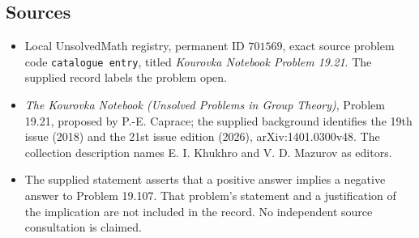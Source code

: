 \documentclass[11pt]{article}
\begin{document}
\subsection{Sources}
\begin{itemize}
\item Local UnsolvedMath registry, permanent ID \(701569\), exact source problem code \texttt{catalogue entry}, titled \emph{Kourovka Notebook Problem 19.21}. The supplied record labels the problem open.
\item \emph{The Kourovka Notebook (Unsolved Problems in Group Theory)}, Problem 19.21, proposed by P.-E. Caprace; the supplied background identifies the 19th issue (2018) and the 21st issue edition (2026), arXiv:1401.0300v48. The collection description names E. I. Khukhro and V. D. Mazurov as editors.
\item The supplied statement asserts that a positive answer implies a negative answer to Problem 19.107. That problem's statement and a justification of the implication are not included in the record. No independent source consultation is claimed.
\end{itemize}
\end{document}
